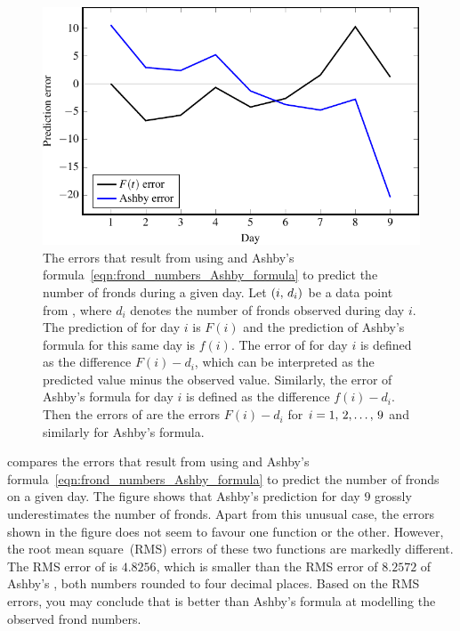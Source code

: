 \documentclass[a4paper,oneside,12pt]{article}
\begin{document}
\begin{problem}
{\begin{solution}
\begin{figure}[!htbp]
\centering
\includegraphics[scale=1.1]{image/11/frond-errors.pdf}
\caption{%
  The errors that result from using
   and Ashby's
  formula~\eqref{eqn:frond_numbers_Ashby_formula} to predict the
  number of fronds during a given day.  Let $\left\lparen{i},\, {d_i}\right\rparen$ be a data
  point from , where $d_i$ denotes
  the number of fronds observed during day $i$.  The prediction of
   for day $i$ is
  $F(i)$ and the prediction of Ashby's formula for this same day is
  $f(i)$.  The error of
   for day $i$ is
  defined as the difference $F(i) - d_i$, which can be interpreted as
  the predicted value minus the observed value.  Similarly, the error
  of Ashby's formula for day $i$ is defined as the difference
  $f(i) - d_i$.  Then the errors of
   are the errors
  $F(i) - d_i$ for $i = {1},\, {2}, \dots,\, {9}$ and similarly for Ashby's
  formula.
}
\label{fig:frond_error_analysis}
\end{figure}

 compares the errors that result from
using  and Ashby's
formula~\eqref{eqn:frond_numbers_Ashby_formula} to predict the number
of fronds on a given day.  The figure shows that Ashby's prediction
for day $9$ grossly underestimates the number of fronds.  Apart from
this unusual case, the errors shown in the figure does not seem to
favour one function or the other.  However, the root mean square~(RMS)
errors of these two functions are markedly different.  The RMS error
of  is $4.8256$,
which is smaller than the RMS error of $8.2572$ of Ashby's
, both numbers rounded to
four decimal places.  Based on the RMS errors, you may conclude that
 is better than
Ashby's formula at modelling the observed frond numbers.
\end{solution}
}{}


\end{problem}
\end{document}
